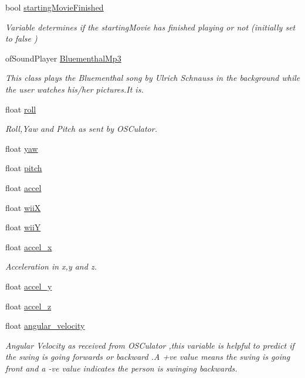 \begin{DoxyCompactItemize}
bool \hyperlink{classtest_app_aea3cb9f5f0061a42a4953d6b6c949036}{starting\-Movie\-Finished}
\begin{DoxyCompactList}\small\item\em Variable determines if the starting\-Movie has finished playing or not (initially set to false ) \end{DoxyCompactList}\item 
of\-Sound\-Player \hyperlink{classtest_app_af696fd13ee9ecb38ac0ba0b72543ce06}{Bluementhal\-Mp3}
\begin{DoxyCompactList}\small\item\em This class plays the Bluementhal song by Ulrich Schnauss in the background while the user watches his/her pictures.\-It is. \end{DoxyCompactList}\item 
float \hyperlink{group___wii_mote_ga020730abb55e6ae6d0a28edee19050e0}{roll}
\begin{DoxyCompactList}\small\item\em Roll,Yaw and Pitch as sent by O\-S\-Culator. \end{DoxyCompactList}\item 
float \hyperlink{group___wii_mote_ga865985f78dd5def3ed20c87b9fc772b6}{yaw}
\item 
float \hyperlink{group___wii_mote_gaabbebeb113838374f659e86a0355b260}{pitch}
\item 
float \hyperlink{group___wii_mote_ga8e560e923c82d421857538e4a5927542}{accel}
\item 
float \hyperlink{group___wii_mote_ga7a77e8633c3a94e3e409a33a5cd9ae3f}{wii\-X}
\item 
float \hyperlink{group___wii_mote_ga5ae41896388ae16ee530beca5333e02a}{wii\-Y}
\item 
float \hyperlink{group___wii_mote_gad1738ff98d225f80b853a9ddc9f5a116}{accel\-\_\-x}
\begin{DoxyCompactList}\small\item\em Acceleration in x,y and z. \end{DoxyCompactList}\item 
float \hyperlink{group___wii_mote_ga204bcb2412a70a65ebea6008ee8c4eb0}{accel\-\_\-y}
\item 
float \hyperlink{group___wii_mote_ga61dbdd5c0b868568dde40a52f6e56054}{accel\-\_\-z}
\item 
float \hyperlink{group___wii_mote_ga98e05c3206ff95fccfebfc9df5317598}{angular\-\_\-velocity}
\begin{DoxyCompactList}\small\item\em Angular Velocity as received from O\-S\-Culator ,this variable is helpful to predict if the swing is going forwards or backward .A +ve value means the swing is going front and a -\/ve value indicates the person is swinging backwards. \end{DoxyCompactList}\item 

\end{DoxyCompactItemize}
